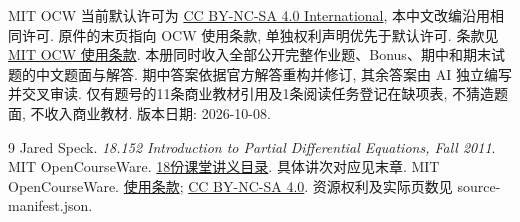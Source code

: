 MIT OCW 当前默认许可为 \href{https://creativecommons.org/licenses/by-nc-sa/4.0/}{CC BY-NC-SA 4.0 International}, 本中文改编沿用相同许可. 原件的末页指向 OCW 使用条款, 单独权利声明优先于默认许可. 条款见 \href{https://ocw.mit.edu/pages/privacy-and-terms-of-use/}{MIT OCW 使用条款}. 本册同时收入全部公开完整作业题、Bonus、期中和期末试题的中文题面与解答. 期中答案依据官方解答重构并修订, 其余答案由 AI 独立编写并交叉审读. 仅有题号的11条商业教材引用及1条阅读任务登记在缺项表, 不猜造题面, 不收入商业教材. 版本日期: 2026-10-08.
\clearpage

\clearpage
{}
\originalcontents
\clearpage
\mainmatter























\begin{thebibliography}{9}
 Jared Speck. \textit{18.152 Introduction to Partial Differential Equations, Fall 2011}. MIT OpenCourseWare. \href{https://ocw.mit.edu/courses/18-152-introduction-to-partial-differential-equations-fall-2011/pages/lecture-notes/}{18份课堂讲义目录}. 具体讲次对应见末章.
 MIT OpenCourseWare. \href{https://ocw.mit.edu/pages/privacy-and-terms-of-use/}{使用条款}; \href{https://creativecommons.org/licenses/by-nc-sa/4.0/}{CC BY-NC-SA 4.0}. 资源权利及实际页数见 source-manifest.json.
\end{thebibliography}

